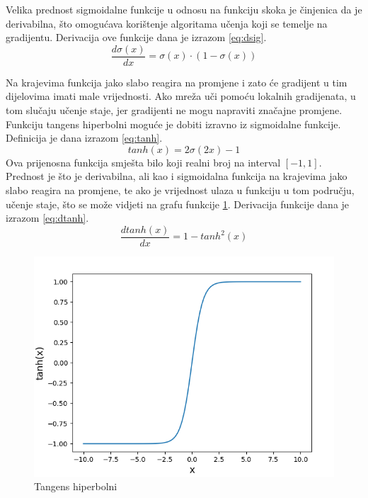 \documentclass[times, utf8, zavrsni, numeric]{fer}
\begin{document}
Velika prednost sigmoidalne funkcije u odnosu na funkciju skoka je činjenica da 
je derivabilna, što omogućava korištenje algoritama učenja koji se temelje na 
gradijentu. Derivacija ove funkcije dana je izrazom \ref{eq:dsig}.
\begin{equation}
	\frac{d\sigma(x)}{dx} = \sigma(x)\cdot(1-\sigma(x))
	\label{eq:dsig}
\end{equation}

Na krajevima funkcija jako slabo reagira na promjene i zato će gradijent u tim 
dijelovima imati male vrijednosti. Ako mreža uči pomoću lokalnih gradijenata,
u tom slučaju učenje staje, jer gradijenti ne mogu napraviti značajne promjene.
\\\indent
Funkciju tangens hiperbolni moguće je dobiti izravno iz sigmoidalne funkcije.
Definicija je dana izrazom \ref{eq:tanh}.
\begin{equation}
	tanh(x) = 2\sigma(2x)-1
	\label{eq:tanh}
\end{equation}
Ova prijenosna funkcija smješta bilo koji realni broj na interval $[-1, 1]$.
Prednost je što je derivabilna, ali kao i sigmoidalna funkcija na krajevima jako
slabo reagira na promjene, te ako je vrijednost ulaza u funkciju u tom području, 
učenje staje, što se može vidjeti na grafu funkcije \ref{fig:tanh_fun}. Derivacija 
funkcije dana je izrazom \ref{eq:dtanh}.
\begin{equation}
	\frac{dtanh(x)}{dx} = 1 - tanh^2(x)
	\label{eq:dtanh}
\end{equation}
\begin{figure}[htb]
	\centering
	\includegraphics[scale=0.35]{tanh_fun.png}
	\caption{Tangens hiperbolni}
	\label{fig:tanh_fun}
\end{figure}
\end{document}
